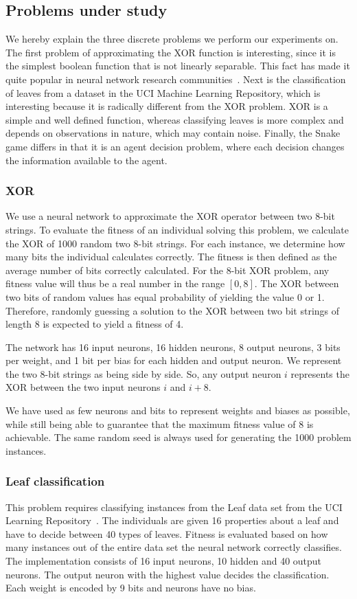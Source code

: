 \subsection{Problems under study}
\label{sec:problems}
We hereby explain the three discrete problems we perform our experiments on. The first problem of approximating the XOR function is interesting, since it is the simplest boolean function that is not linearly separable. This fact has made it quite popular in neural network research communities~\cite{masterThesisGANN}. Next is the classification of leaves from a dataset in the UCI Machine Learning Repository, which is interesting because it is radically different from the XOR problem. XOR is a simple and well defined function, whereas classifying leaves is more complex and depends on observations in nature, which may contain noise. Finally, the Snake game differs in that it is an agent decision problem, where each decision changes the information available to the agent.

\subsubsection{XOR}
We use a neural network to approximate the XOR operator between two 8-bit strings. To evaluate the fitness of an individual solving this problem, we calculate the XOR of \num{1000} random two 8-bit strings. For each instance, we determine how many bits the individual calculates correctly. The fitness is then defined as the average number of bits correctly calculated. For the 8-bit XOR problem, any fitness value will thus be a real number in the range $[0, 8]$. The XOR between two bits of random values has equal probability of yielding the value 0 or 1. Therefore, randomly guessing a solution to the XOR between two bit strings of length 8 is expected to yield a fitness of 4.

The network has 16 input neurons, 16 hidden neurons, 8 output neurons, 3 bits per weight, and 1 bit per bias for each hidden and output neuron. We represent the two 8-bit strings as being side by side. So, any output neuron $i$ represents the XOR between the two input neurons $i$ and $i + 8$. 

We have used as few neurons and bits to represent weights and biases as possible, while still being able to guarantee that the maximum fitness value of 8 is achievable.
The same random seed is always used for generating the 1000 problem instances.

\subsubsection{Leaf classification}
This problem requires classifying instances from the Leaf data set from the UCI Learning Repository~\cite{Bache+Lichman:2013, leafdataset}. The individuals are given 16 properties about a leaf and have to decide between 40 types of leaves. Fitness is evaluated based on how many instances out of the entire data set the neural network correctly classifies. The implementation consists of 16 input neurons, 10 hidden and 40 output neurons. The output neuron with the highest value decides the classification. Each weight is encoded by 9 bits and neurons have no bias.

